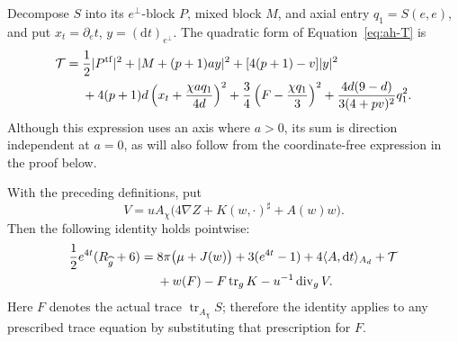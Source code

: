 Decompose \(S\) into its \(e^\perp\)-block \(P\), mixed block \(M\),
and axial entry \(q_1=S(e,e)\), and put
\(x_t=\partial_e t\), \(y=(\mathrm dt)_{e^\perp}\).
The quadratic form of Equation~\eqref{eq:ah-T} is
\begin{align}
 \mathcal T={}&\frac12|P^{\mathrm{tf}}|^2
       +|M+(p+1)a y|^2+[4(p+1)-v]|y|^2 \notag\\
 &+4(p+1)d\left(x_t+\frac{\chi a q_1}{4d}\right)^2
       +\frac34\left(F-\frac{\chi q_1}{3}\right)^2
       +\frac{4d(9-d)}{3(4+pv)^2}q_1^2 .
 \label{eq:ah-alg-T}
\end{align}
Although this expression uses an axis where \(a>0\), its sum is
direction independent at \(a=0\), as will also follow from the
coordinate-free expression in the proof below.

\begin{proposition}
\label{prop:ah-alg-curvature}
With the preceding definitions, put
\begin{equation}
 V=uA_\chi\bigl(4\nabla Z+K(w,\cdot)^\sharp+A(w)w\bigr).
 \label{eq:ah-alg-V}
\end{equation}
Then the following identity holds pointwise:
\begin{align}
 \frac12e^{4t}(R_{\widehat g}+6)
 ={}&8\pi\bigl(\mu+J(w)\bigr)+3(e^{4t}-1)
       +4\langle A,\mathrm dt\rangle_{A_d}
       +\mathcal T \notag\\
 &+w(F)-F\operatorname{tr}_gK-u^{-1}\operatorname{div}_g V .
 \label{eq:ah-alg-curvature-identity}
\end{align}
Here \(F\) denotes the actual trace
\(\operatorname{tr}_{A_\chi}S\); therefore the identity applies to
any prescribed trace equation by substituting that prescription for
\(F\).
\end{proposition}


